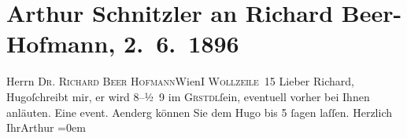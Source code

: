 

         
         \renewcommand{\erwaehntePersonen}{Personen: Richard Beer-Hofmann, Hugo von Hofmannsthal}
         \renewcommand{\erwaehnteOrte}{Orte: Café Griensteidl, I., Innere Stadt, IX., Alsergrund, Wien, Wollzeile}
         \renewcommand{\erwaehnteWerke}{}
               \section[Arthur Schnitzler an Richard Beer-Hofmann, 2. 6. 1896]{ Arthur Schnitzler an Richard Beer-Hofmann, 2. 6. 1896}\nopagebreak{}\rehead{ }\begin{ledgroupsized}[t]{13cm}\normalsize\beginnumbering \toendnotes[C]{\smallbreak\pagebreak[2]} 
\pstart{}{\pb}Herrn \textsc{Dr. Richard Beer
                     Hofmann}\pend{}\pstart{}Wien\pend{}\pstart{}\textsc{I Wollzeile 15}\pend{}{\bigskip}\pstart
           \noindent{}Lieber Richard, Hugoſchreibt mir, er wird
                  8–½ 9 im \textsc{Grstdl}ſein, eventuell vorher bei Ihnen anläuten. Eine
               event. Aenderg können Sie dem Hugo bis
                  5{ }ſagen laſſen.\pend
           \pstart
           Herzlich{\\[\baselineskip]}Ihr\spacefill\mbox{Arthur}\pend
           \leftskip=0em{}
         
         \endnumbering{}\end{ledgroupsized}  \newcommand{\dateiname}{L00548}\newcommand{\titel}{Arthur Schnitzler an Richard Beer-Hofmann, 2. 6. 1896}\newcommand{\editorInnen}{Martin Anton Müller und Gerd-Hermann Susen}
      